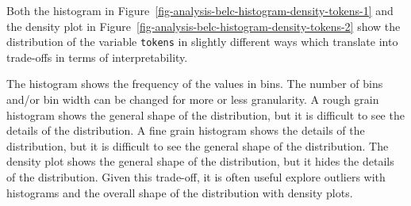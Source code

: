 \documentclass[
  letterpaper,
  krantz1]{latex/krantz-mod}
\theoremstyle{definition}
\theoremstyle{definition}
\theoremstyle{remark}
\begin{document}
Both the histogram in
Figure~\ref{fig-analysis-belc-histogram-density-tokens-1} and the
density plot in
Figure~\ref{fig-analysis-belc-histogram-density-tokens-2} show the
distribution of the variable \texttt{tokens} in slightly different ways
which translate into trade-offs in terms of interpretability.

The histogram shows the frequency of the values in bins. The number of
bins and/or bin width can be changed for more or less granularity. A
rough grain histogram shows the general shape of the distribution, but
it is difficult to see the details of the distribution. A fine grain
histogram shows the details of the distribution, but it is difficult to
see the general shape of the distribution. The density plot shows the
general shape of the distribution, but it hides the details of the
distribution. Given this trade-off, it is often
useful explore outliers with histograms and the overall
shape of the distribution with density plots.
\end{document}
